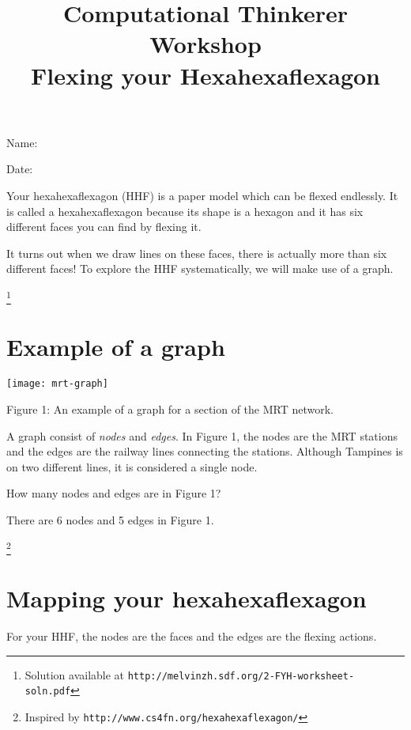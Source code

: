 \documentclass[a4paper,12pt]{article}
\title{Computational Thinkerer Workshop\\
Flexing your Hexahexaflexagon
\vspace{-2cm}}
\date{}
\newcommand\Blank[2][.33\linewidth]{%
  \rule{0pt}{4ex}%
  #2\enspace
  \makebox[#1]{\hrulefill}}
\begin{document}
\maketitle
\begin{flushright}
  \Blank{Name:}

  \Blank{Date:}
\end{flushright}


Your hexahexaflexagon (HHF) is a paper model which can be flexed
endlessly. It is called a hexahexaflexagon because its shape is a hexagon and it
has six different faces you can find by flexing it.

It turns out when we draw lines on these faces, there is actually more than six
different faces! To explore the HHF systematically, we will make use of a graph.

\let\thefootnote\relax\footnote{Solution available at \texttt{http://melvinzh.sdf.org/2-FYH-worksheet-soln.pdf}}

\section*{Example of a graph}
\begin{center}
\texttt{[image: mrt-graph]}

Figure 1: An example of a graph for a section of the MRT network.   
\end{center}

A graph consist of \emph{nodes} and \emph{edges}. In Figure 1, the nodes are the
MRT stations and the edges are the railway lines connecting the stations.
Although Tampines is on two different lines, it is considered a single node.  

\begin{question}[skip-below=3\baselineskip]
How many nodes and edges are in Figure 1?
\end{question}
\begin{solution}
There are 6 nodes and 5 edges in Figure 1. 
\end{solution}

\newpage
\let\thefootnote\relax\footnote{Inspired by \texttt{http://www.cs4fn.org/hexahexaflexagon/}}
\section*{Mapping your hexahexaflexagon}
For your HHF, the nodes are the faces and the edges are the flexing actions.
\end{document}
